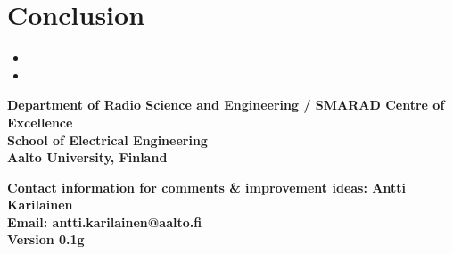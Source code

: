 \documentclass[portrait,a0,final]{a0poster} %
\begin{document}
\begin{minipage}{0.98\linewidth}
\begin{minipage}[t]{0.47\linewidth}
\section{Conclusion}

\begin{itemize}
	\item \lipsum[5]
	\item \lipsum[6]
\end{itemize}



{\footnotesize %





} %



\end{minipage}
\end{minipage} %





\vfill %


\begin{minipage}{0.95\linewidth} %


\footnotesize %


\begin{minipage}[t]{0.47\linewidth}%
\vspace{0pt}

\textsf{\textbf{Department of Radio Science and Engineering / SMARAD Centre of Excellence\\
School of Electrical Engineering\\
Aalto University, Finland}}

\end{minipage} %
\hspace{0.03\linewidth}
\begin{minipage}[t]{0.47\linewidth} %
\vspace{0pt}

\textsf{\textbf{Contact information for comments \& improvement ideas: Antti Karilainen\\
Email: antti.karilainen@aalto.fi\\
Version 0.1g}}
\end{minipage}



\end{minipage}




\vspace*{0.03\linewidth} %
\end{document}

